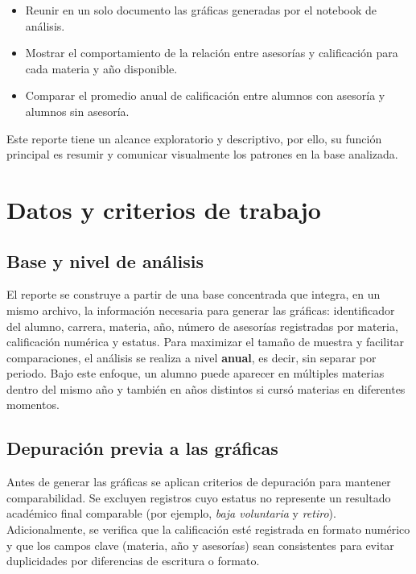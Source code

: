\documentclass[12pt]{article}
\begin{document}
\begin{itemize}
    \item Reunir en un solo documento las gráficas generadas por el notebook de análisis.
    \item Mostrar el comportamiento de la relación entre asesorías y calificación para cada materia y año disponible.
    \item Comparar el promedio anual de calificación entre alumnos con asesoría y alumnos sin asesoría.
\end{itemize}

Este reporte tiene un alcance exploratorio y descriptivo, por ello, su función principal es resumir y comunicar visualmente los patrones en la base analizada.

\newpage
\section{Datos y criterios de trabajo}

\subsection{Base y nivel de análisis}
El reporte se construye a partir de una base concentrada que integra, en un mismo archivo, la información necesaria para generar las gráficas: identificador del alumno, carrera, materia, año, número de asesorías registradas por materia, calificación numérica y estatus. Para maximizar el tamaño de muestra y facilitar comparaciones, el análisis se realiza a nivel \textbf{anual}, es decir, sin separar por periodo. Bajo este enfoque, un alumno puede aparecer en múltiples materias dentro del mismo año y también en años distintos si cursó materias en diferentes momentos.

\subsection{Depuración previa a las gráficas}
Antes de generar las gráficas se aplican criterios de depuración para mantener comparabilidad. Se excluyen registros cuyo estatus no represente un resultado académico final comparable (por ejemplo, \textit{baja voluntaria} y \textit{retiro}). Adicionalmente, se verifica que la calificación esté registrada en formato numérico y que los campos clave (materia, año y asesorías) sean consistentes para evitar duplicidades por diferencias de escritura o formato.
\end{document}
